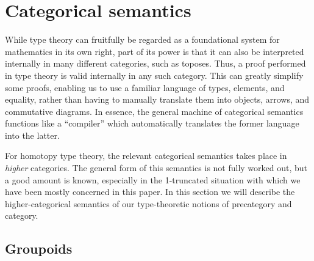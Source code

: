 \section{Categorical semantics}
\label{sec:semantics}

While type theory can fruitfully be regarded as a foundational system for mathematics in its own right, part of its power is that it can also be interpreted internally in many different categories, such as toposes.
Thus, a proof performed in type theory is valid internally in any such category.
This can greatly simplify some proofs, enabling us to use a familiar language of types, elements, and equality, rather than having to manually translate them into objects, arrows, and commutative diagrams.
In essence, the general machine of categorical semantics functions like a ``compiler'' which automatically translates the former language into the latter.

For homotopy type theory, the relevant categorical semantics takes place in \emph{higher} categories.
The general form of this semantics is not fully worked out, but a good amount is known, especially in the 1-truncated situation with which we have been mostly concerned in this paper.
In this section we will describe the higher-categorical semantics of our type-theoretic notions of precategory and category.

\subsection{Groupoids}
\label{sec:groupoids}

